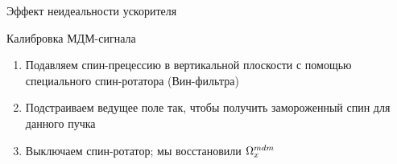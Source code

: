 \documentclass[14pt]{beamer}
\newcommand{\Wmdm}{\W^{mdm}}
\begin{document}
\begin{frame}{Эффект неидеальности ускорителя}
	\centering
\end{frame}

\begin{frame}{Калибровка МДМ-сигнала}
	\begin{enumerate}[<+->]
		\item Подавляем спин-прецессию в вертикальной плоскости с помощью специального спин-ротатора (Вин-фильтра)
		\item Подстраиваем ведущее поле так, чтобы получить замороженный спин для данного пучка
		\item Выключаем спин-ротатор; мы восстановили $\Wmdm_x$
	\end{enumerate}
\end{frame}
\end{document}

